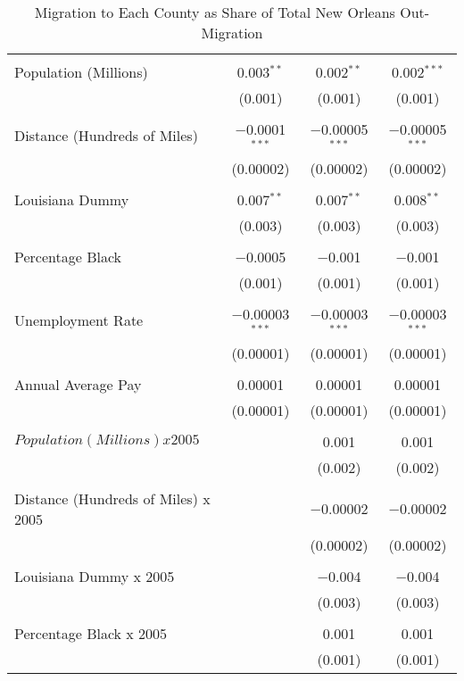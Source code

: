 \documentclass[]{article}
\begin{document}
\clearpage

\begin{table}[!htbp] \scriptsize \centering 
  \caption{Migration to Each County as Share of Total New Orleans Out-Migration} 
  \label{tab:percmigols} 
\begin{tabular}{@{\extracolsep{5pt}}lccc} 
\hline \\[-1.8ex] 
  Population (Millions) & 0.003$^{**}$ & 0.002$^{**}$ & 0.002$^{***}$ \\ 
  & (0.001) & (0.001) & (0.001) \\ 
  & & & \\ 
 Distance (Hundreds of Miles) & $-$0.0001$^{***}$ & $-$0.00005$^{***}$ & $-$0.00005$^{***}$ \\ 
  & (0.00002) & (0.00002) & (0.00002) \\ 
  & & & \\ 
 Louisiana Dummy & 0.007$^{**}$ & 0.007$^{**}$ & 0.008$^{**}$ \\ 
  & (0.003) & (0.003) & (0.003) \\ 
  & & & \\ 
 Percentage Black & $-$0.0005 & $-$0.001 & $-$0.001 \\ 
  & (0.001) & (0.001) & (0.001) \\ 
  & & & \\ 
 Unemployment Rate & $-$0.00003$^{***}$ & $-$0.00003$^{***}$ & $-$0.00003$^{***}$ \\ 
  & (0.00001) & (0.00001) & (0.00001) \\ 
  & & & \\ 
 Annual Average Pay & 0.00001 & 0.00001 & 0.00001 \\ 
  & (0.00001) & (0.00001) & (0.00001) \\ 
  & & & \\ 
 $Population (Millions) x 2005$ &  & 0.001 & 0.001 \\ 
  &  & (0.002) & (0.002) \\ 
  & & & \\ 
 Distance (Hundreds of Miles) x 2005 &  & $-$0.00002 & $-$0.00002 \\ 
  &  & (0.00002) & (0.00002) \\ 
  & & & \\ 
 Louisiana Dummy x 2005 &  & $-$0.004 & $-$0.004 \\ 
  &  & (0.003) & (0.003) \\ 
  & & & \\ 
 Percentage Black x 2005 &  & 0.001 & 0.001 \\ 
  &  & (0.001) & (0.001) \\ 

\end{tabular}
\end{table}
\end{document}
